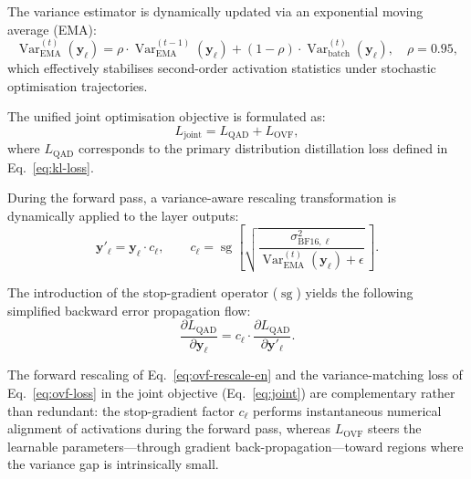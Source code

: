 \documentclass[a4paper,fleqn]{cas-sc}
\begin{document}
The variance estimator is dynamically updated via an exponential moving average (EMA):
\begin{equation}
\label{eq:ema}
\operatorname{Var}^{(t)}_{\mathrm{EMA}}(\bm{y}_\ell)
= \rho \cdot \operatorname{Var}^{(t-1)}_{\mathrm{EMA}}(\bm{y}_\ell)
+ (1-\rho) \cdot \operatorname{Var}^{(t)}_{\mathrm{batch}}(\bm{y}_\ell),
\quad \rho = 0.95,
\end{equation}
which effectively stabilises second-order activation statistics under stochastic optimisation trajectories.

The unified joint optimisation objective is formulated as:
\begin{equation}
\label{eq:joint}
L_{\mathrm{joint}} = L_{\mathrm{QAD}} + L_{\mathrm{OVF}},
\end{equation}
where $L_{\mathrm{QAD}}$ corresponds to the primary distribution distillation loss defined in Eq.~\eqref{eq:kl-loss}.

During the forward pass, a variance-aware rescaling transformation is dynamically applied to the layer outputs:
\begin{equation}
\label{eq:ovf-rescale-en}
\bm{y}'_\ell = \bm{y}_\ell \cdot c_\ell, \qquad
c_\ell = \operatorname{sg}\!\left[\sqrt{\frac{\sigma^2_{\mathrm{BF16},\ell}}{\operatorname{Var}^{(t)}_{\mathrm{EMA}}(\bm{y}_\ell) + \epsilon}}\,\right].
\end{equation}

The introduction of the stop-gradient operator ($\operatorname{sg}$) yields the following simplified backward error propagation flow:
\begin{equation}
\label{eq:ovf-detach-en}
\frac{\partial L_{\mathrm{QAD}}}{\partial\bm{y}_\ell}
= c_\ell \cdot \frac{\partial L_{\mathrm{QAD}}}{\partial\bm{y}'_\ell}.
\end{equation}

The forward rescaling of Eq.~\eqref{eq:ovf-rescale-en} and the variance-matching loss of Eq.~\eqref{eq:ovf-loss} in the joint objective (Eq.~\eqref{eq:joint}) are complementary rather than redundant: the stop-gradient factor $c_\ell$ performs instantaneous numerical alignment of activations during the forward pass, whereas $L_{\mathrm{OVF}}$ steers the learnable parameters---through gradient back-propagation---toward regions where the variance gap is intrinsically small.
\end{document}
